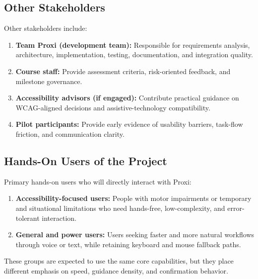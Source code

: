 \documentclass[12pt]{article}
\begin{document}
\subsection{Other Stakeholders}
Other stakeholders include:
\begin{enumerate}
  \item \textbf{Team Proxi (development team):} Responsible for
  requirements analysis, architecture, implementation, testing,
  documentation, and integration quality.
  \item \textbf{Course staff:} Provide assessment criteria,
  risk-oriented feedback, and milestone governance.
  \item \textbf{Accessibility advisors (if engaged):} Contribute
  practical guidance on WCAG-aligned decisions and assistive-technology
  compatibility.
  \item \textbf{Pilot participants:} Provide early evidence of
  usability barriers, task-flow friction, and communication clarity.
\end{enumerate}

\subsection{Hands-On Users of the Project}
Primary hands-on users who will directly interact with Proxi:
\begin{enumerate}
  \item \textbf{Accessibility-focused users:} People with motor
  impairments or temporary and situational limitations who need
  hands-free, low-complexity, and error-tolerant interaction.
  \item \textbf{General and power users:} Users seeking faster and
  more natural workflows through voice or text, while retaining
  keyboard and mouse fallback paths.
\end{enumerate}

These groups are expected to use the same core capabilities, but they
place different emphasis on speed, guidance density, and confirmation
behavior.
\end{document}
